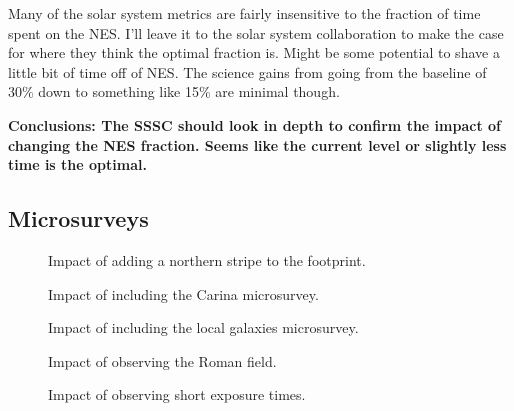 Many of the solar system metrics are fairly insensitive to the fraction of time spent on the NES. I'll leave it to the solar system collaboration to make the case for where they think the optimal fraction is. Might be some potential to shave a little bit of time off of NES. The science gains from going from the baseline of 30\% down to something like 15\% are minimal though.

{\bf Conclusions:  The SSSC should look in depth to confirm the impact of changing the NES fraction. Seems like the current level or slightly less time is the optimal.}


\subsection{Microsurveys}

\begin{figure}
\caption{Impact of adding a northern stripe to the footprint. \label{fig:north_stripe} }
\end{figure}



\begin{figure}
\caption{Impact of including the Carina microsurvey.  \label{fig:carina}}
\end{figure}


\begin{figure}
\caption{Impact of including the local galaxies microsurvey. \label{fig:local_gals}}
\end{figure}

\begin{figure}
\caption{Impact of observing the Roman field.  \label{fig:roman}}
\end{figure}


\begin{figure}
\caption{Impact of observing short exposure times.  \label{fig:short_exp}}
\end{figure}

